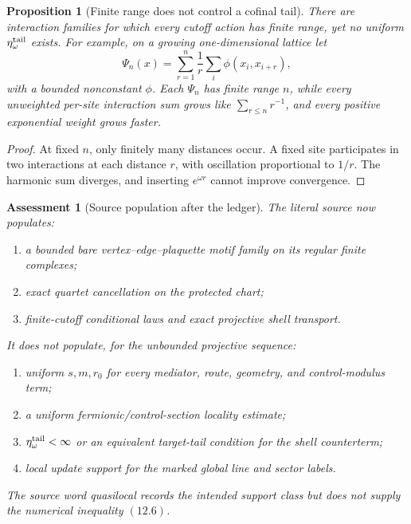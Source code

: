\documentclass[11pt]{article}
\newtheorem{proposition}[theorem]{Proposition}
\newtheorem{assessment}[theorem]{Assessment}
\theoremstyle{remark}
\begin{document}
\begin{proposition}[Finite range does not control a cofinal tail]
\label{prop:v15v12-finite-range-no-tail}
There are interaction families for which every cutoff action has
finite range, yet no uniform \(\eta_\omega^{\rm tail}\) exists.
For example, on a growing one-dimensional lattice let
\[
 \Psi_n(x)=\sum_{r=1}^{n}\frac1r
 \sum_i \phi(x_i,x_{i+r}),                                   \tag{12.11}
\]
with a bounded nonconstant \(\phi\).  Each \(\Psi_n\) has finite
range \(n\), while every unweighted per-site interaction sum grows
like \(\sum_{r\le n}r^{-1}\), and every positive exponential
weight grows faster.
\end{proposition}

\begin{proof}
At fixed \(n\), only finitely many distances occur.  A fixed site
participates in two interactions at each distance \(r\), with
oscillation proportional to \(1/r\).  The harmonic sum diverges,
and inserting \(e^{\omega r}\) cannot improve convergence.
\end{proof}

\begin{assessment}[Source population after the ledger]
\label{ass:v15v12-source}
The literal source now populates:
\begin{enumerate}
\item a bounded bare vertex--edge--plaquette motif family on its
      regular finite complexes;
\item exact quartet cancellation on the protected chart;
\item finite-cutoff conditional laws and exact projective shell
      transport.
\end{enumerate}
It does not populate, for the unbounded projective sequence:
\begin{enumerate}
\item uniform \(s,m,r_0\) for every mediator, route, geometry, and
      control-modulus term;
\item a uniform fermionic/control-section locality estimate;
\item \(\eta_\omega^{\rm tail}<\infty\) or an equivalent
      target-tail condition for the shell counterterm;
\item local update support for the marked global line and sector
      labels.
\end{enumerate}
The source word \emph{quasilocal} records the intended support
class but does not supply the numerical inequality \((12.6)\).
\end{assessment}
\end{document}
